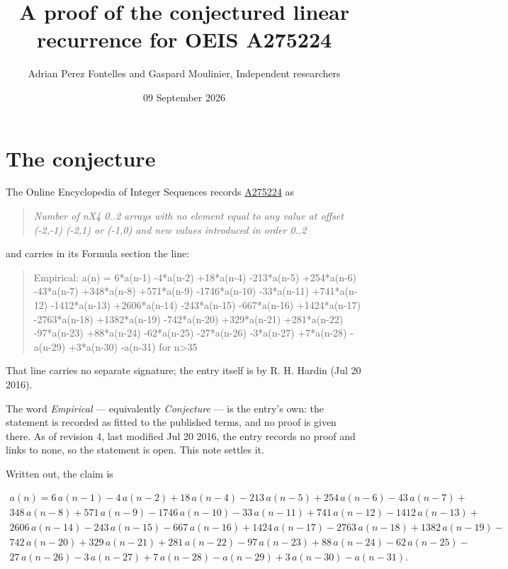 \documentclass[11pt]{article}
\title{A proof of the conjectured linear recurrence for OEIS A275224}
\author{Adrian Perez Fontelles and Gaspard Moulinier, Independent researchers}
\date{09 September 2026}
\theoremstyle{definition}
\begin{document}
\maketitle
\section{The conjecture}

The Online Encyclopedia of Integer Sequences records \href{https://oeis.org/A275224}{A275224} as

\begin{quote}\itshape Number of nX4 0..2 arrays with no element equal to any value at offset (-2,-1) (-2,1) or (-1,0) and new values introduced in order 0..2\end{quote}

and carries in its Formula section the line:

\begin{quote}\ttfamily Empirical: a(n) = 6*a(n-1) -4*a(n-2) +18*a(n-4) -213*a(n-5) +254*a(n-6) -43*a(n-7) +348*a(n-8) +571*a(n-9) -1746*a(n-10) -33*a(n-11) +741*a(n-12) -1412*a(n-13) +2606*a(n-14) -243*a(n-15) -667*a(n-16) +1424*a(n-17) -2763*a(n-18) +1382*a(n-19) -742*a(n-20) +329*a(n-21) +281*a(n-22) -97*a(n-23) +88*a(n-24) -62*a(n-25) -27*a(n-26) -3*a(n-27) +7*a(n-28) -a(n-29) +3*a(n-30) -a(n-31) for n>35\end{quote}

That line carries no separate signature; the entry itself is by R. H. Hardin (Jul 20 2016).

The word {\itshape Empirical} --- equivalently {\itshape Conjecture} --- is the entry's own: the statement is recorded as fitted to the published terms, and no proof is given there. As of revision 4, last modified Jul 20 2016, the entry records no proof and links to none, so the statement is open. This note settles it.

Written out, the claim is

\begin{multline*} a(n) = 6\,a(n-1) - 4\,a(n-2) + 18\,a(n-4) - 213\,a(n-5) + 254\,a(n-6) - 43\,a(n-7) + \\ 348\,a(n-8) + 571\,a(n-9) - 1746\,a(n-10) - 33\,a(n-11) + 741\,a(n-12) - 1412\,a(n-13) + \\ 2606\,a(n-14) - 243\,a(n-15) - 667\,a(n-16) + 1424\,a(n-17) - 2763\,a(n-18) + 1382\,a(n-19) - \\ 742\,a(n-20) + 329\,a(n-21) + 281\,a(n-22) - 97\,a(n-23) + 88\,a(n-24) - 62\,a(n-25) - \\ 27\,a(n-26) - 3\,a(n-27) + 7\,a(n-28) - a(n-29) + 3\,a(n-30) - a(n-31). \end{multline*}
\end{document}
